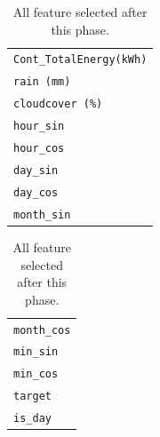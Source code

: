 \begin{table}[H]
\begin{center}
\begin{tabular}[t]{l|}
			\verb|Cont_TotalEnergy(kWh)|        \\
			\verb|rain (mm)|                    \\
			\verb|cloudcover (%)|               \\
			\verb|hour_sin|                     \\
			\verb|hour_cos|                     \\
			\verb|day_sin|                      \\
			\verb|day_cos|                      \\
			\verb|month_sin|
		\end{tabular}
		\begin{tabular}[t]{l}
			\verb|month_cos| \\
			\verb|min_sin|   \\
			\verb|min_cos|   \\
			\verb|target|    \\
			\verb|is_day|
		\end{tabular}
	\end{center}
	\caption{All feature selected after this phase.}\label{tab:featselected}
\end{table}


